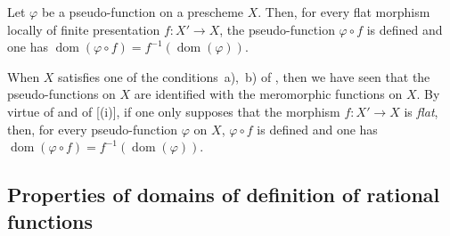 \begin{corollary}[20.3.12]
\label{IV.20.3.12}
Let $\varphi$ be a pseudo-function on a prescheme $X$.
Then, for every flat morphism locally of finite presentation $f:X'\to X$, the pseudo-function $\varphi\circ f$ is defined and one has $\operatorname{dom}(\varphi\circ f)=f^{-1}(\operatorname{dom}(\varphi))$.
\end{corollary}

\begin{remark}[20.3.13]
\label{IV.20.3.13}
When $X$ satisfies one of the conditions~a),~b) of , then we have seen  that the pseudo-functions on $X$ are identified with the meromorphic functions on $X$.
By virtue of  and of [(i)], if one only supposes that the morphism $f:X'\to X$ is \emph{flat}, then, for every pseudo-function $\varphi$ on $X$, $\varphi\circ f$ is defined and one has $\operatorname{dom}(\varphi\circ f)=f^{-1}(\operatorname{dom}(\varphi))$.
\end{remark}

\subsection{Properties of domains of definition of rational functions}
\label{IV.20.4}

